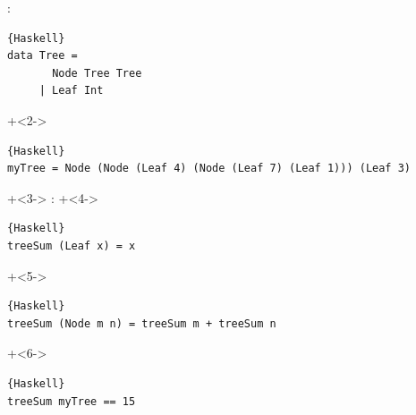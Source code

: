 \begin{frame}[fragile]{}
:
\begin{lstlisting}{Haskell}
data Tree =
       Node Tree Tree
     | Leaf Int
\end{lstlisting}

\onslide+<2->
\begin{lstlisting}{Haskell}
myTree = Node (Node (Leaf 4) (Node (Leaf 7) (Leaf 1))) (Leaf 3)
\end{lstlisting}


\onslide+<3->
:
\onslide+<4->
\begin{lstlisting}{Haskell}
treeSum	(Leaf x) = x
\end{lstlisting}
\onslide+<5->
\vspace{-1.1em}
\begin{lstlisting}{Haskell}
treeSum (Node m n) = treeSum m + treeSum n
\end{lstlisting}
\onslide+<6->
\begin{lstlisting}{Haskell}
treeSum myTree == 15
\end{lstlisting}
\end{frame}


